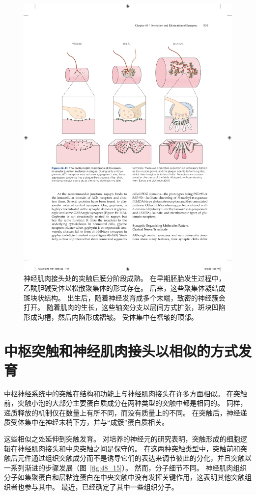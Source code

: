 \begin{figure}[htbp]
	\centering
	\includegraphics[width=0.9\linewidth]{chap48/fig_48_14}
	\caption{神经肌肉接头处的突触后膜分阶段成熟。
		在早期胚胎发生过程中，乙酰胆碱受体以松散聚集体的形式存在。
		后来，这些聚集体凝结成斑块状结构。
		出生后，随着神经发育成多个末端，致密的神经簇会打开。
		随着肌肉的生长，这些轴突分支以层间方式扩张，斑块凹陷形成沟槽，然后内陷形成褶皱。
		受体集中在褶皱的顶部\cite{sanes2001induction}。}
	\label{fig:48_14}
\end{figure}



\section{中枢突触和神经肌肉接头以相似的方式发育}

中枢神经系统中的突触在结构和功能上与神经肌肉接头在许多方面相似。
在突触前，突触小泡的大部分主要蛋白质成分在两种类型的突触中都是相同的。
同样，递质释放的机制仅在数量上有所不同，而没有质量上的不同。
在突触后，神经递质受体集中在神经末梢下方，并与“成簇”蛋白质相关。


这些相似之处延伸到突触发育。
对培养的神经元的研究表明，突触形成的细胞逻辑在神经肌肉接头和中央突触之间是保守的。
在这两种突触类型中，突触前和突触后元件通过组织突触成分而不是诱导它们的表达来调节彼此的分化，并且突触以一系列渐进的步骤发展（图~\ref{fig:48_15}）。
然而，分子细节不同。
神经肌肉组织分子如集聚蛋白和层粘连蛋白在中央突触中没有发挥关键作用，这表明其他突触组织者也参与其中。
最近，已经确定了其中一些组织分子。


